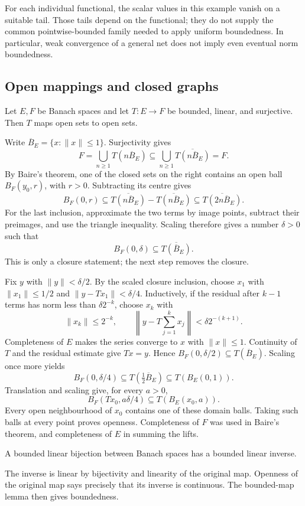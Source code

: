 For each individual functional, the scalar values in this example vanish
on a suitable tail. Those tails depend on the functional; they do not
supply the common pointwise-bounded family needed to apply uniform
boundedness. In particular, weak convergence of a general net does not
imply even eventual norm boundedness.

\subsection{Open mappings and closed graphs}
\begin{theorem}
\label{thm:open_mapping}
Let $E,F$ be Banach spaces and let $T:E\to F$ be bounded, linear,
and surjective. Then $T$ maps open sets to open sets.
\end{theorem}
\Proof
Write $\overline B_E=\{x:\|x\|\leq1\}$. Surjectivity gives
\[
F=\bigcup_{n\geq1}T(n\overline B_E)
 \subseteq\bigcup_{n\geq1}\overline{T(n\overline B_E)}=F.
\]
By Baire's theorem, one of the closed sets on the right contains an
open ball $B_F(y_0,r)$, with $r>0$. Subtracting its centre gives
\[
B_F(0,r)\subseteq
\overline{T(n\overline B_E)}-\overline{T(n\overline B_E)}
\subseteq\overline{T(2n\overline B_E)}.
\]
For the last inclusion, approximate the two terms by image points,
subtract their preimages, and use the triangle inequality. Scaling
therefore gives a number $\delta>0$ such that
\[
B_F(0,\delta)\subseteq\overline{T(\overline B_E)}.
\]
This is only a closure statement; the next step removes the closure.

Fix $y$ with $\|y\|<\delta/2$. By the scaled closure inclusion,
choose $x_1$ with $\|x_1\|\leq1/2$ and
$\|y-Tx_1\|<\delta/4$. Inductively, if the residual after $k-1$
terms has norm less than $\delta2^{-k}$, choose $x_k$ with
\[
\|x_k\|\leq2^{-k},\qquad
\left\|y-T\sum_{j=1}^k x_j\right\|<\delta2^{-(k+1)}.
\]
Completeness of $E$ makes the series converge to $x$ with $\|x\|\leq1$.
Continuity of $T$ and the residual estimate give $Tx=y$. Hence
$B_F(0,\delta/2)\subseteq T(\overline B_E)$. Scaling once more yields
\[
B_F(0,\delta/4)\subseteq T(\tfrac12\overline B_E)
\subseteq T(B_E(0,1)).
\]
Translation and scaling give, for every $a>0$,
\[
B_F(Tx_0,a\delta/4)\subseteq T(B_E(x_0,a)).
\]
Every open neighbourhood of $x_0$ contains one of these domain balls.
Taking such balls at every point proves openness. Completeness of $F$
was used in Baire's theorem, and completeness of $E$ in summing the lifts.
\Done

\begin{corollary}
\label{thm:bounded_inverse}
A bounded linear bijection between Banach spaces has a bounded linear
inverse.
\end{corollary}
\Proof
The inverse is linear by bijectivity and linearity of the original map.
Openness of the original map says precisely that its inverse is
continuous. The bounded-map lemma then gives boundedness.
\Done

